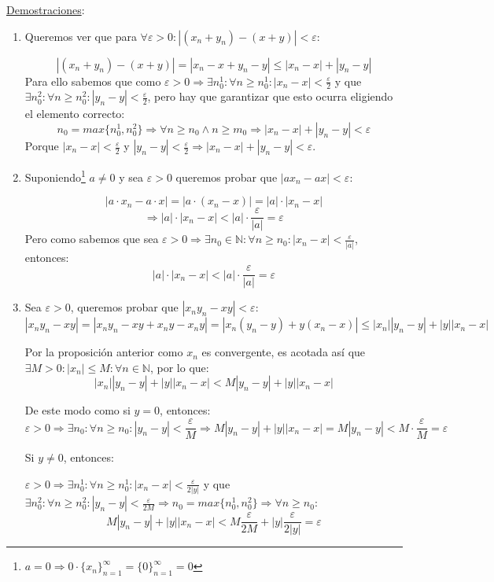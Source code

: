 \documentclass[10pt,a4paper,openright]{book}
\begin{document}
\underline{Demostraciones}:
\begin{enumerate}
\item Queremos ver que para $\forall \varepsilon>0: |(x_n+y_n)-(x+y)|<\varepsilon$:

$$|(x_n+y_n)-(x+y)|=|x_n-x+y_n-y|\leq |x_n-x|+|y_n-y|$$
Para ello sabemos que como $\varepsilon>0\Rightarrow\exists n_0^1: \forall n\geq n_0^1: |x_n-x|<\frac{\varepsilon}{2}$ y que $\exists n_0^2: \forall n \geq n_0^2: |y_n-y|<\frac{\varepsilon}{2}$, pero hay que garantizar que esto ocurra eligiendo el elemento correcto:
$$n_0=max\{n_0^1, n_0^2\}\Rightarrow \forall n\geq n_0\wedge n\geq m_0\Rightarrow |x_n-x|+|y_n-y|<\varepsilon$$
Porque $|x_n-x|<\frac{\varepsilon}{2}$ y $|y_n-y|<\frac{\varepsilon}{2}\Rightarrow |x_n-x|+|y_n-y|<\varepsilon$.
\vspace{0.35cm}

\item Suponiendo\footnote{$a=0\Rightarrow 0\cdot \{x_n\}_{n=1}^\infty=\{0\}_{n=1}^\infty=0$} $a\neq 0$ y sea $\varepsilon>0$ queremos probar que $|ax_n-ax|<\varepsilon$:

$$|a\cdot x_n-a\cdot x|=|a\cdot (x_n-x)|=|a|\cdot |x_n-x|$$
$$\Rightarrow |a|\cdot |x_n-x| < |a|\cdot \frac{\varepsilon}{|a|}=\varepsilon$$
Pero como sabemos que sea $\varepsilon>0\Rightarrow \exists n_0\in \mathbb N: \forall n\geq n_0: |x_n-x|<\frac{\varepsilon}{|a|}$, entonces:
$$|a|\cdot |x_n-x| < |a|\cdot \frac{\varepsilon}{|a|}=\varepsilon$$

\item Sea $\varepsilon>0$, queremos probar que $|x_ny_n-xy|<\varepsilon$:
$$|x_ny_n-xy|=|x_ny_n-xy+x_ny-x_ny|=|x_n(y_n-y)+y(x_n-x)|\leq |x_n||y_n-y|+|y||x_n-x|$$

Por la proposición anterior como $x_n$ es convergente, es acotada así que $\exists M>0: |x_n|\leq M: \forall n\in \mathbb N$, por lo que:
$$|x_n||y_n-y|+|y||x_n-x|< M|y_n-y|+|y||x_n-x|$$

De este modo como si $y=0$, entonces:
$$\varepsilon>0\Rightarrow\exists n_0: \forall n\geq n_0: |y_n-y|<\frac{\varepsilon}{M}\Rightarrow M|y_n-y|+|y||x_n-x|=M|y_n-y|<M\cdot \frac{\varepsilon}{M}=\varepsilon$$

Si $y\neq 0$, entonces:\par
$\varepsilon>0\Rightarrow\exists n_0^1: \forall n\geq n_0^1: |x_n-x|<\frac{\varepsilon}{2|y|}$ y que $\exists n_0^2: \forall n \geq n_0^2: |y_n-y|<\frac{\varepsilon}{2M}\Rightarrow n_0=max\{n_0^1, n_0^2\}\Rightarrow \forall n\geq n_0:$
$$M|y_n-y|+|y||x_n-x|< M\frac{\varepsilon}{2M}+|y|\frac{\varepsilon}{2|y|}=\varepsilon$$


\end{enumerate}
\end{document}
